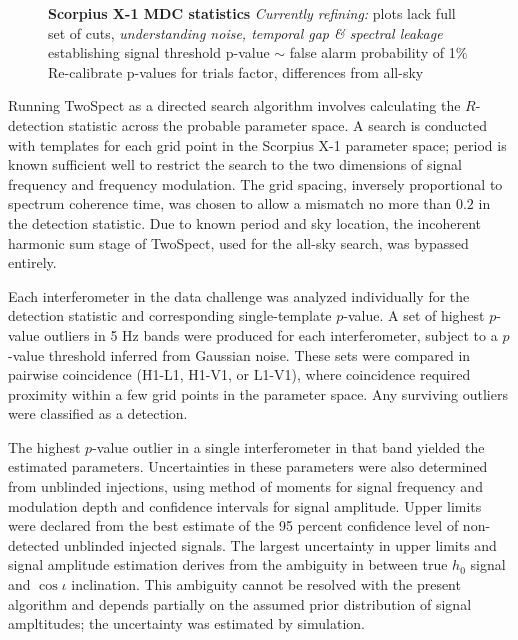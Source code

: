 \begin{figure}
\begin{center}
\caption{\textbf{Scorpius X-1 MDC statistics}
\newline \emph{Currently refining: }plots lack full set of cuts,
\newline \emph{understanding noise, temporal gap \& spectral leakage}
\newline establishing signal threshold p-value $\sim$ false alarm probability of 1\%
\newline Re-calibrate p-values for trials factor, differences from all-sky
}
\end{center}
\end{figure}



Running TwoSpect as a directed search algorithm involves calculating
the $R$-detection statistic across the probable parameter space. 
A search is conducted with templates for each grid point in the Scorpius 
X-1 parameter space; period is known sufficient well to restrict the search
to the two dimensions of signal frequency and frequency modulation. The
grid spacing, inversely proportional to spectrum coherence time, was
chosen to allow a mismatch no more than $0.2$ in the detection statistic.
Due to known period and sky location, the incoherent harmonic sum stage
of TwoSpect, used for the all-sky search, was bypassed entirely. 

Each interferometer in the data challenge was analyzed individually for 
the detection statistic and corresponding single-template $p$-value. A set
of highest $p$-value outliers in 5 Hz bands were produced for each 
interferometer, subject to a $p$-value threshold inferred from Gaussian noise.
These sets were compared in pairwise coincidence (H1-L1, H1-V1, or L1-V1),
where coincidence required proximity within a few grid points in the 
parameter space. Any surviving outliers were classified as a detection. 

The highest $p$-value outlier in a single interferometer in that band 
yielded the estimated parameters. Uncertainties in these parameters were also
determined from unblinded injections, using method of moments for signal
frequency and modulation depth and confidence intervals for signal
amplitude. Upper limits were declared from the best estimate of the 95
percent confidence level of non-detected unblinded injected signals. The
largest uncertainty in upper limits and signal amplitude estimation derives
from the ambiguity in between true $h_0$ signal and $\cos \iota$ inclination.
This ambiguity cannot be resolved with the present algorithm and depends
partially on the assumed prior distribution of signal ampltitudes; the
uncertainty was estimated by simulation.  


